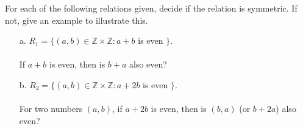 \documentclass[a4paper,12pt]{book}
\newcounter{question}
\begin{document}
    \begin{questionNOGRADE}{\thequestion}

        For each of the following relations given, decide if the relation is symmetric. If not, give an example to illustrate this.

        \begin{itemize}
            \item[a.]   $R_{1} = \{ (a, b) \in \mathbb{Z} \times \mathbb{Z} : a + b$ is even $\}$.
                        \\ \\  If $a+b$ is even, then is $b+a$ also even?


            \item[b.]   $R_{2} = \{ (a,b) \in \mathbb{Z} \times \mathbb{Z} : a + 2b$ is even $\}$.
                        \\ \\ For two numbers $(a,b)$, if $a+2b$ is even, then is $(b,a)$ (or $b + 2a$) also even?

        \end{itemize}
    \end{questionNOGRADE}

\notonkey{ \newpage }{ \hrulefill }
 
\end{document}
